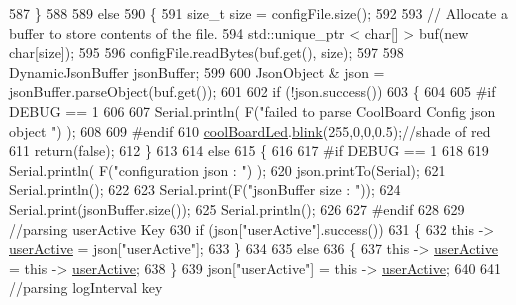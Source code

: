 \begin{DoxyCode}
587     \}
588 
589     \textcolor{keywordflow}{else}
590     \{
591         \textcolor{keywordtype}{size\_t} size = configFile.size();
592 
593         \textcolor{comment}{// Allocate a buffer to store contents of the file.}
594         std::unique\_ptr < char[] > buf(\textcolor{keyword}{new} \textcolor{keywordtype}{char}[size]);
595 
596         configFile.readBytes(buf.get(), size);
597 
598         DynamicJsonBuffer jsonBuffer;
599 
600         JsonObject & json = jsonBuffer.parseObject(buf.get());
601 
602         \textcolor{keywordflow}{if} (!json.success())
603         \{
604         
605 \textcolor{preprocessor}{        #if DEBUG == 1}
606 
607             Serial.println( F(\textcolor{stringliteral}{"failed to parse CoolBoard Config json object "}) );
608     
609 \textcolor{preprocessor}{        #endif}
610             \hyperlink{classCoolBoard_a1b1d3c684a5baa56b08486e192fd8e97}{coolBoardLed}.\hyperlink{classCoolBoardLed_a96e1ea13003eee34c9dbcef340404426}{blink}(255,0,0,0.5);\textcolor{comment}{//shade of red     }
611             \textcolor{keywordflow}{return}(\textcolor{keyword}{false});
612         \}
613 
614         \textcolor{keywordflow}{else}
615         \{   
616         
617 \textcolor{preprocessor}{        #if DEBUG == 1}
618             
619             Serial.println( F(\textcolor{stringliteral}{"configuration json : "}) );
620             json.printTo(Serial);
621             Serial.println();
622             
623             Serial.print(F(\textcolor{stringliteral}{"jsonBuffer size : "}));
624             Serial.print(jsonBuffer.size());
625             Serial.println();
626 
627 \textcolor{preprocessor}{        #endif}
628             
629             \textcolor{comment}{//parsing userActive Key}
630             \textcolor{keywordflow}{if} (json[\textcolor{stringliteral}{"userActive"}].success())
631             \{
632                 \textcolor{keyword}{this} -> \hyperlink{classCoolBoard_a6395459131d6889a3005f79c7a35e964}{userActive} = json[\textcolor{stringliteral}{"userActive"}];
633             \}
634 
635             \textcolor{keywordflow}{else}
636             \{
637                 \textcolor{keyword}{this} -> \hyperlink{classCoolBoard_a6395459131d6889a3005f79c7a35e964}{userActive} = \textcolor{keyword}{this} -> \hyperlink{classCoolBoard_a6395459131d6889a3005f79c7a35e964}{userActive};
638             \}
639             json[\textcolor{stringliteral}{"userActive"}] = \textcolor{keyword}{this} -> \hyperlink{classCoolBoard_a6395459131d6889a3005f79c7a35e964}{userActive};
640 
641             \textcolor{comment}{//parsing logInterval key}

\end{DoxyCode}
